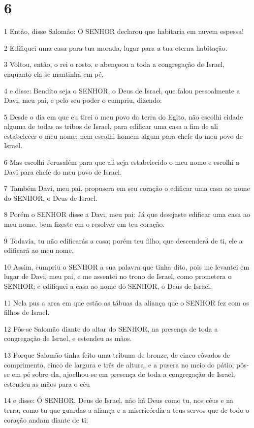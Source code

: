 \chapter{6}

\par 1 Então, disse Salomão: O SENHOR declarou que habitaria em nuvem espessa!
\par 2 Edifiquei uma casa para tua morada, lugar para a tua eterna habitação.
\par 3 Voltou, então, o rei o rosto, e abençoou a toda a congregação de Israel, enquanto ela se mantinha em pé,
\par 4 e disse: Bendito seja o SENHOR, o Deus de Israel, que falou pessoalmente a Davi, meu pai, e pelo seu poder o cumpriu, dizendo:
\par 5 Desde o dia em que eu tirei o meu povo da terra do Egito, não escolhi cidade alguma de todas as tribos de Israel, para edificar uma casa a fim de ali estabelecer o meu nome; nem escolhi homem algum para chefe do meu povo de Israel.
\par 6 Mas escolhi Jerusalém para que ali seja estabelecido o meu nome e escolhi a Davi para chefe do meu povo de Israel.
\par 7 Também Davi, meu pai, propusera em seu coração o edificar uma casa ao nome do SENHOR, o Deus de Israel.
\par 8 Porém o SENHOR disse a Davi, meu pai: Já que desejaste edificar uma casa ao meu nome, bem fizeste em o resolver em teu coração.
\par 9 Todavia, tu não edificarás a casa; porém teu filho, que descenderá de ti, ele a edificará ao meu nome.
\par 10 Assim, cumpriu o SENHOR a sua palavra que tinha dito, pois me levantei em lugar de Davi, meu pai, e me assentei no trono de Israel, como prometera o SENHOR; e edifiquei a casa ao nome do SENHOR, o Deus de Israel.
\par 11 Nela pus a arca em que estão as tábuas da aliança que o SENHOR fez com os filhos de Israel.
\par 12 Pôs-se Salomão diante do altar do SENHOR, na presença de toda a congregação de Israel, e estendeu as mãos.
\par 13 Porque Salomão tinha feito uma tribuna de bronze, de cinco côvados de comprimento, cinco de largura e três de altura, e a pusera no meio do pátio; pôs-se em pé sobre ela, ajoelhou-se em presença de toda a congregação de Israel, estendeu as mãos para o céu
\par 14 e disse: Ó SENHOR, Deus de Israel, não há Deus como tu, nos céus e na terra, como tu que guardas a aliança e a misericórdia a teus servos que de todo o coração andam diante de ti;
